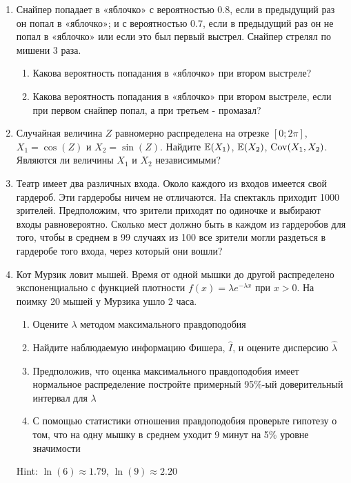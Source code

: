 \documentclass[12pt, a4paper]{article}\usepackage[]{graphicx}\usepackage[]{color}
\begin{document}
\begin{enumerate}

\item Снайпер попадает в «яблочко» с вероятностью 0.8, если в предыдущий раз он попал в «яблочко»; и с вероятностью 0.7, если в предыдущий раз он не попал в «яблочко» или если это был первый выстрел. Снайпер стрелял по мишени 3 раза.
\begin{enumerate}
\item Какова вероятность попадания в «яблочко» при втором выстреле?
\item Какова вероятность попадания в «яблочко» при втором выстреле, если при первом снайпер попал, а при третьем - промазал?
\end{enumerate}

\item Случайная величина $Z$ равномерно распределена на отрезке  $[0;2\pi]$, $X_1=\cos(Z)$ и $X_2=\sin(Z)$. Найдите $\mathbb{E}(X_1)$, $\mathbb{E}(X_2)$, $\operatorname{Cov}(X_1,X_2)$. Являются ли величины $X_1$ и $X_2$ независимыми?

\item Театр имеет два различных входа. Около каждого из входов имеется свой гардероб. Эти гардеробы ничем не отличаются.  На спектакль приходит 1000 зрителей. Предположим, что зрители приходят по одиночке и выбирают входы равновероятно. Сколько мест должно быть в каждом из гардеробов для того, чтобы в среднем в 99 случаях из 100 все зрители могли раздеться в гардеробе того входа, через который они вошли?

\item Кот Мурзик ловит мышей. Время от одной мышки до другой распределено экспоненциально с функцией плотности $f(x)=\lambda e^{-\lambda x}$ при $x>0$. На поимку 20 мышей у Мурзика ушло 2 часа.
\begin{enumerate}
\item Оцените $\lambda$ методом максимального правдоподобия
\item Найдите наблюдаемую информацию Фишера, $\hat{I}$, и оцените дисперсию $\hat{\lambda}$
\item Предположив, что оценка максимального правдоподобия имеет нормальное распределение постройте примерный 95\%-ый доверительный интервал для $\lambda$
\item С помощью статистики отношения правдоподобия проверьте гипотезу о том, что на одну мышку в среднем уходит 9 минут на 5\% уровне значимости
\end{enumerate}

Hint: $\ln(6)\approx 1.79$, $\ln(9)\approx 2.20$



\end{enumerate}
\end{document}
